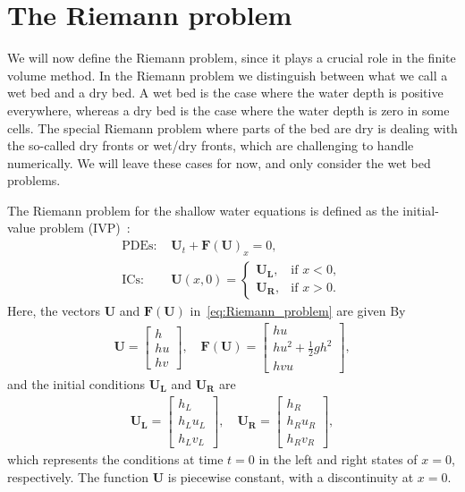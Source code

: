 \section{The Riemann problem}
We will now define the Riemann problem, since it plays a crucial role in the finite volume method.
In the Riemann problem we distinguish between what we call a wet bed and a dry bed. 
A wet bed is the case where the water depth is positive everywhere, whereas a dry bed is the case where the water depth is zero in some cells.
The special Riemann problem where parts of the bed are dry is dealing with the so-called dry fronts or wet/dry fronts, which are challenging to handle numerically.
We will leave these cases for now, and only consider the wet bed problems.

The Riemann problem for the shallow water equations is defined as the initial-value problem (IVP)~\cite{Toro2024}:
\begin{equation}\label{eq:Riemann_problem}
    \begin{aligned}
        \text{PDEs: } &\mathbf{U}_t + {\mathbf{F(U)}}_x = 0, \\
        \text{ICs: } &\mathbf{U}(x, 0) = \begin{cases}
            \mathbf{U_L}, & \text{if  } x < 0, \\
            \mathbf{U_R}, & \text{if  } x > 0.
        \end{cases}
    \end{aligned}
    \end{equation}
Here, the vectors $\mathbf{U}$ and $\mathbf{F(U)}$ in~\eqref{eq:Riemann_problem} are given By
\begin{align}
    \mathbf{U} = \begin{bmatrix}
        h \\ hu \\ hv
    \end{bmatrix}, \quad
    \mathbf{F(U)} = \begin{bmatrix}
        hu \\ hu^2 + \frac{1}{2}gh^2 \\ hvu
    \end{bmatrix},
\end{align}
and the initial conditions $\mathbf{U_L}$ and $\mathbf{U_R}$ are
\begin{align*}
    \mathbf{U_L} = \begin{bmatrix}
        h_L \\ h_L u_L \\ h_L v_L
    \end{bmatrix}, \quad 
    \mathbf{U_R} = \begin{bmatrix}
        h_R \\ h_R u_R \\ h_R v_R
    \end{bmatrix},
\end{align*}
which represents the conditions at time $t = 0$ in the left and right states of $x=0$, respectively.
The function $\mathbf{U}$ is piecewise constant, with a discontinuity at $x=0$.

